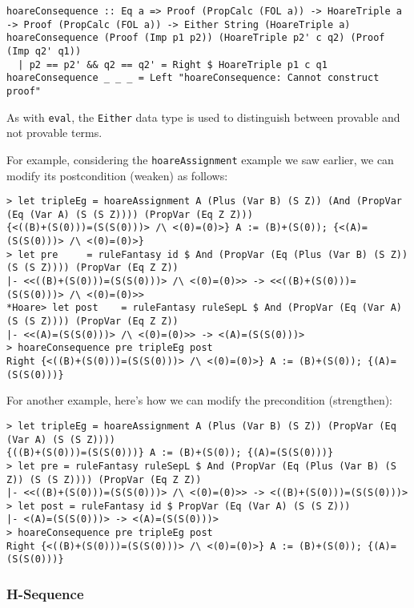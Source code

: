 \documentclass{article}
\begin{document}
\begin{lstlisting}
hoareConsequence :: Eq a => Proof (PropCalc (FOL a)) -> HoareTriple a -> Proof (PropCalc (FOL a)) -> Either String (HoareTriple a)
hoareConsequence (Proof (Imp p1 p2)) (HoareTriple p2' c q2) (Proof (Imp q2' q1))
  | p2 == p2' && q2 == q2' = Right $ HoareTriple p1 c q1
hoareConsequence _ _ _ = Left "hoareConsequence: Cannot construct proof"
\end{lstlisting}

As with \texttt{eval}, the \texttt{Either} data type is used to distinguish between provable and not provable terms.

For example, considering the \texttt{hoareAssignment} example we saw earlier, we can modify its postcondition (weaken) as follows:

\begin{lstlisting}
> let tripleEg = hoareAssignment A (Plus (Var B) (S Z)) (And (PropVar (Eq (Var A) (S (S Z)))) (PropVar (Eq Z Z)))
{<((B)+(S(0)))=(S(S(0)))> /\ <(0)=(0)>} A := (B)+(S(0)); {<(A)=(S(S(0)))> /\ <(0)=(0)>}
> let pre     = ruleFantasy id $ And (PropVar (Eq (Plus (Var B) (S Z)) (S (S Z)))) (PropVar (Eq Z Z))
|- <<((B)+(S(0)))=(S(S(0)))> /\ <(0)=(0)>> -> <<((B)+(S(0)))=(S(S(0)))> /\ <(0)=(0)>>
*Hoare> let post    = ruleFantasy ruleSepL $ And (PropVar (Eq (Var A) (S (S Z)))) (PropVar (Eq Z Z))
|- <<(A)=(S(S(0)))> /\ <(0)=(0)>> -> <(A)=(S(S(0)))>
> hoareConsequence pre tripleEg post
Right {<((B)+(S(0)))=(S(S(0)))> /\ <(0)=(0)>} A := (B)+(S(0)); {(A)=(S(S(0)))}
\end{lstlisting}

For another example, here's how we can modify the precondition (strengthen):

\begin{lstlisting}
> let tripleEg = hoareAssignment A (Plus (Var B) (S Z)) (PropVar (Eq (Var A) (S (S Z))))
{((B)+(S(0)))=(S(S(0)))} A := (B)+(S(0)); {(A)=(S(S(0)))}
> let pre = ruleFantasy ruleSepL $ And (PropVar (Eq (Plus (Var B) (S Z)) (S (S Z)))) (PropVar (Eq Z Z))
|- <<((B)+(S(0)))=(S(S(0)))> /\ <(0)=(0)>> -> <((B)+(S(0)))=(S(S(0)))>
> let post = ruleFantasy id $ PropVar (Eq (Var A) (S (S Z)))
|- <(A)=(S(S(0)))> -> <(A)=(S(S(0)))>
> hoareConsequence pre tripleEg post 
Right {<((B)+(S(0)))=(S(S(0)))> /\ <(0)=(0)>} A := (B)+(S(0)); {(A)=(S(S(0)))}
\end{lstlisting}

\subsubsection{H-Sequence}
\end{document}
